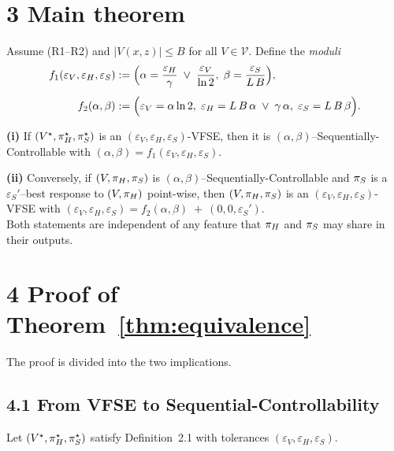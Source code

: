 \section*{3 \; Main theorem}

\begin{theorem}[Equivalence]
\label{thm:equivalence}
Assume (R1–R2) and $|V(x,z)|\le B$ for all $V\in\mathcal V$.
Define the \emph{moduli}
\[
\begin{aligned}
f_1(\varepsilon_V,\varepsilon_H,\varepsilon_S)
      &:=\Bigl( \alpha=\frac{\varepsilon_H}{\gamma}\;\vee\;\frac{\varepsilon_V}{\ln 2},
                 \;\beta=\frac{\varepsilon_S}{L\,B}\Bigr),\\[4pt]
f_2(\alpha,\beta)
      &:=\Bigl( \varepsilon_V=\alpha\ln 2,\;
                 \varepsilon_H=L\,B\,\alpha\;\vee\;\gamma\,\alpha,\;
                 \varepsilon_S=L\,B\,\beta\Bigr).
\end{aligned}
\]

\smallskip\noindent
\textbf{(i)}
If $(V^\star,\pi_H^\star,\pi_S^\star)$ is an
$(\varepsilon_V,\varepsilon_H,\varepsilon_S)$-VFSE,
then it is
$(\alpha,\beta)$–Sequentially-Controllable with $(\alpha,\beta)=
f_1(\varepsilon_V,\varepsilon_H,\varepsilon_S)$.

\smallskip\noindent
\textbf{(ii)}
Conversely, if $(V,\pi_H,\pi_S)$ is $(\alpha,\beta)$–Sequentially-Controllable and $\pi_S$ is a $\varepsilon_S'$–best response to $(V,\pi_H)$ point-wise, then $(V,\pi_H,\pi_S)$ is an $(\varepsilon_V,\varepsilon_H,\varepsilon_S)$-VFSE with $(\varepsilon_V,\varepsilon_H,\varepsilon_S) = f_2(\alpha,\beta)\;+\ (0,0,\varepsilon_S')$.
\\
Both statements are independent of any feature that $\pi_H$ and $\pi_S$ may share in their outputs.
\end{theorem}

\section*{4 \; Proof of Theorem~\ref{thm:equivalence}}

The proof is divided into the two implications.

\subsection*{4.1 \; From VFSE to Sequential-Controllability}

Let $(V^\star,\pi_H^\star,\pi_S^\star)$ satisfy Definition~2.1 with
tolerances $(\varepsilon_V,\varepsilon_H,\varepsilon_S)$.

